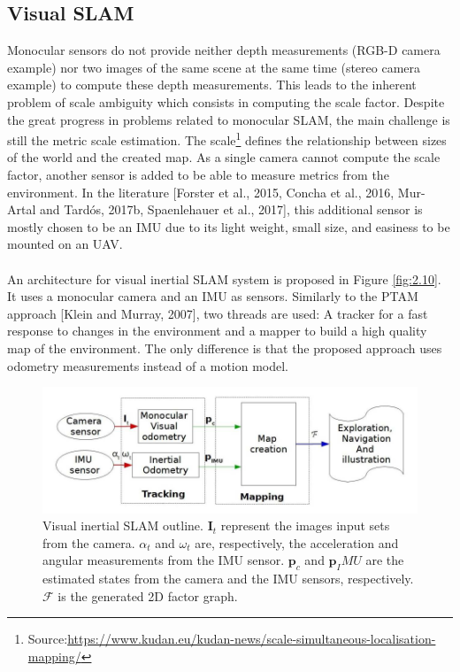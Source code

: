 \subsection{Visual SLAM}
Monocular sensors do not provide neither depth measurements (RGB-D camera example) nor two images of the same scene at the same time (stereo camera example) to compute these depth measurements. This leads to the inherent problem of scale ambiguity which consists in computing the scale factor. Despite the great progress in problems related to monocular SLAM, the main challenge is still the metric scale estimation. The scale\footnote{Source:\url{https://www.kudan.eu/kudan-news/scale-simultaneous-localisation-mapping/}} deﬁnes the relationship between sizes of the world and the created map. As a single camera cannot compute the scale factor, another sensor is added to be able to measure metrics from the environment. In the literature [Forster et al., 2015, Concha et al., 2016, Mur-Artal and Tardós, 2017b, Spaenlehauer et al., 2017], this additional sensor is mostly chosen to be an IMU due to its light weight, small size, and easiness to be mounted on an UAV.\\\\
An architecture for visual inertial SLAM system is proposed in Figure \ref{fig:2.10}. It uses a monocular camera and an IMU as sensors. Similarly to the PTAM approach [Klein and Murray, 2007], two threads are used: A tracker for a fast response to changes in the environment and a mapper to build a high quality map of the environment. The only diﬀerence is that the proposed approach uses odometry measurements instead of a motion model.
\begin{figure}[H]
    \centering
    \includegraphics[scale=0.6]{assets/2_10.png}
    \caption{Visual inertial SLAM outline. $\mathbf{I}_t$ represent the images input sets from the camera. $\alpha_t$ and $\omega_t$ are, respectively, the acceleration and angular measurements from the IMU sensor. $\mathbf{p}_c$ and $\mathbf{p}_IMU$ are the estimated states from the camera and the IMU sensors, respectively. $\mathcal{F}$ is the generated 2D factor graph.}
\end{figure}
